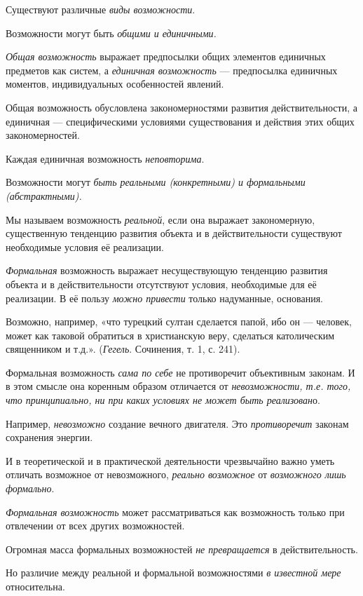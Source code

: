 \documentclass[a4paper,14pt,russian]{extreport}
\begin{document}
Существуют различные \emph{виды возможности}.

Возможности могут быть \emph{общими и единичными.}

\emph{Общая возможность} выражает предпосылки общих элементов единичных предметов как систем, а \emph{единичная возможность} --- предпосылка единичных моментов, индивидуальных особенностей явлений.

Общая возможность обусловлена закономерностями развития действительности, а единичная --- специфическими условиями существования и действия этих общих закономерностей.

Каждая единичная возможность \emph{неповторима}.

Возможности могут \emph{быть реальными (конкретными) и формальными (абстрактными).}

Мы называем возможность \emph{реальной}, если она выражает закономерную, существенную тенденцию развития объекта и в действительности существуют необходимые условия её реализации.

\emph{Формальная} возможность выражает несуществующую тенденцию развития объекта и в действительности отсутствуют условия, необходимые для её реализации. В её пользу \emph{можно привести} только надуманные, основания.

Возможно, например, «что турецкий султан сделается папой, ибо он --- человек, может как таковой обратиться в христианскую веру, сделаться католическим священником и т.д.». (\emph{Гегель}. Сочинения, т. 1, с. 241).

Формальная возможность \emph{сама по себе} не противоречит объективным законам. И в этом смысле она коренным образом отличается от \emph{невозможности, т.е. того, что принципиально, ни при каких условиях не может быть реализован}о.

Например, \emph{невозможно} создание вечного двигателя. Это \emph{противоречит} законам сохранения энергии.

И в теоретической и в практической деятельности чрезвычайно важно уметь отличать возможное от невозможного, \emph{реально возможное} от \emph{возможного лишь формально}.

\emph{Формальная возможность} может рассматриваться как возможность только при отвлечении от всех других возможностей.

Огромная масса формальных возможностей \emph{не превращается} в действительность.

Но различие между реальной и формальной возможностями \emph{в известной мере} относительна.
\end{document}
